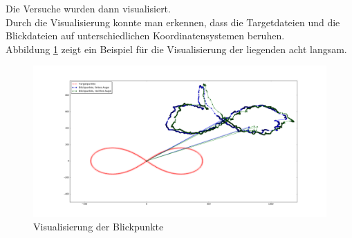 Die Versuche wurden dann visualisiert. \\
Durch die Visualisierung konnte man erkennen, dass die Targetdateien und die Blickdateien auf unterschiedlichen Koordinatensystemen beruhen. \\
Abbildung \ref{fig:Visualisierung} zeigt ein Beispiel f\"ur die Visualisierung der liegenden acht langsam.

\begin{figure}[H]
	\noindent \begin{centering}
		\includegraphics[width=15cm]{pics/figure_1-1.png}
		\par\end{centering}
	\caption{\label{fig:Visualisierung}Visualisierung der Blickpunkte}
\end{figure}
